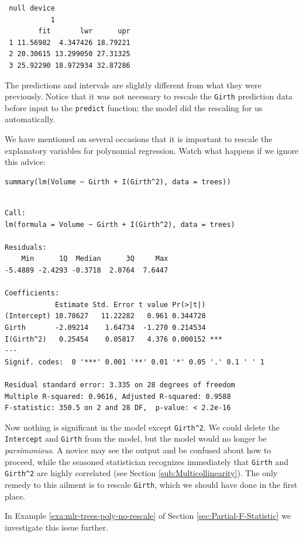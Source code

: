 \documentclass[captions=tableheading]{scrbook}
\begin{document}
\begin{verbatim}
 null device 
           1
        fit       lwr      upr
 1 11.56982  4.347426 18.79221
 2 20.30615 13.299050 27.31325
 3 25.92290 18.972934 32.87286
\end{verbatim}

The predictions and intervals are slightly different from what they were previously. Notice that it was not necessary to rescale the \texttt{Girth} prediction data before input to the \texttt{predict} function; the model did the rescaling for us automatically.

\begin{rem}
We have mentioned on several occasions that it is important to rescale the explanatory variables for polynomial regression. Watch what happens if we ignore this advice:


\begin{verbatim}
summary(lm(Volume ~ Girth + I(Girth^2), data = trees))
\end{verbatim}


\begin{verbatim}

Call:
lm(formula = Volume ~ Girth + I(Girth^2), data = trees)

Residuals:
    Min      1Q  Median      3Q     Max 
-5.4889 -2.4293 -0.3718  2.0764  7.6447 

Coefficients:
            Estimate Std. Error t value Pr(>|t|)    
(Intercept) 10.78627   11.22282   0.961 0.344728    
Girth       -2.09214    1.64734  -1.270 0.214534    
I(Girth^2)   0.25454    0.05817   4.376 0.000152 ***
---
Signif. codes:  0 '***' 0.001 '**' 0.01 '*' 0.05 '.' 0.1 ' ' 1 

Residual standard error: 3.335 on 28 degrees of freedom
Multiple R-squared: 0.9616,	Adjusted R-squared: 0.9588 
F-statistic: 350.5 on 2 and 28 DF,  p-value: < 2.2e-16
\end{verbatim}

Now nothing is significant in the model except \texttt{Girth\textasciicircum{}2}. We could delete the \texttt{Intercept} and \texttt{Girth} from the model, but the model would no longer be \emph{parsimonious}. A novice may see the output and be confused about how to proceed, while the seasoned statistician recognizes immediately that \texttt{Girth} and \texttt{Girth\textasciicircum{}2} are highly correlated (see Section \ref{sub:Multicollinearity}). The only remedy to this ailment is to rescale \texttt{Girth}, which we should have done in the first place.

In Example \ref{exa:mlr-trees-poly-no-rescale} of Section \ref{sec:Partial-F-Statistic} we investigate this issue further.

\end{rem}
\end{document}
